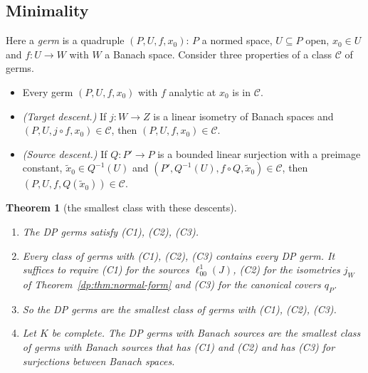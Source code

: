 \documentclass[11pt]{amsart}
\newtheorem{theorem}{Theorem}[section]
\theoremstyle{definition}
\theoremstyle{remark}
\numberwithin{equation}{section}
\newcommand{\cC}{\mathcal{C}}
\theoremstyle{plain}
\theoremstyle{definition}
\theoremstyle{plain}
\begin{document}
\subsection{Minimality}\label{dp:ssec:minimal}

Here a \emph{germ} is a quadruple $(P,U,f,x_0)$: $P$ a normed space, $U\subseteq P$ open, $x_0\in U$ and $f\colon U\to W$ with $W$ a Banach space. Consider three properties of a class $\cC$ of germs.
\begin{itemize}
\item[(C1)] Every germ $(P,U,f,x_0)$ with $f$ analytic at $x_0$ is in $\cC$.
\item[(C2)] \emph{(Target descent.)} If $j\colon W\to Z$ is a linear isometry of Banach spaces and $(P,U,j\circ f,x_0)\in\cC$, then $(P,U,f,x_0)\in\cC$.
\item[(C3)] \emph{(Source descent.)} If $Q\colon P'\to P$ is a bounded linear surjection with a preimage constant, $\tilde x_0\in Q^{-1}(U)$ and $(P',Q^{-1}(U),f\circ Q,\tilde x_0)\in\cC$, then $(P,U,f,Q(\tilde x_0))\in\cC$.
\end{itemize}

\begin{theorem}[the smallest class with these descents]\label{dp:thm:minimal}
\leavevmode
\begin{enumerate}
\item The DP germs satisfy (C1), (C2), (C3).
\item Every class of germs with (C1), (C2), (C3) contains every DP germ. It suffices to require (C1) for the sources $\ell^1_{00}(J)$, (C2) for the isometries $j_W$ of Theorem~\ref{dp:thm:normal-form} and (C3) for the canonical covers $q_P$.
\item So the DP germs are the smallest class of germs with (C1), (C2), (C3).
\item Let $K$ be complete. The DP germs with Banach sources are the smallest class of germs with Banach sources that has (C1) and (C2) and has (C3) for surjections between Banach spaces.
\end{enumerate}
\end{theorem}
\end{document}

